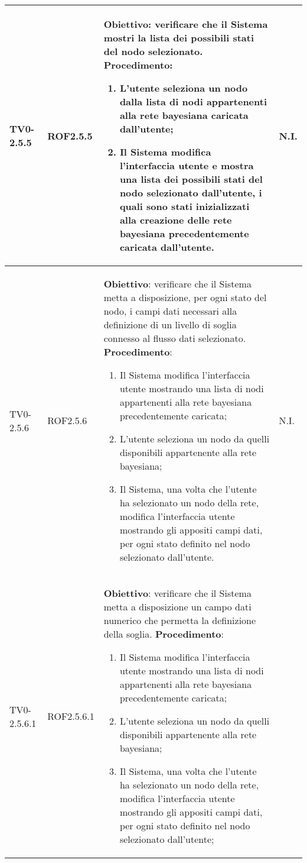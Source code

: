 \begin{longtable}{|C{.15\textwidth}|C{.13\textwidth}|m{.52\textwidth}|C{.08\textwidth}|}
\hline
TV0-2.5.5 & ROF2.5.5 &
	\textbf{Obiettivo}: verificare che il Sistema mostri la lista dei possibili stati del nodo selezionato. \newline
	\textbf{Procedimento}:
	\begin{enumerate}
		\item L'utente seleziona un nodo dalla lista di nodi appartenenti alla rete bayesiana caricata dall'utente;
		\item Il Sistema modifica l'interfaccia utente e mostra una lista dei possibili stati del nodo selezionato dall'utente, i quali sono stati inizializzati alla creazione delle rete bayesiana precedentemente caricata dall'utente.
	\end{enumerate}
	& N.I. \\
\hline
{} TV0-2.5.6 & ROF2.5.6 &
	\textbf{Obiettivo}: verificare che il Sistema metta a disposizione, per ogni stato del nodo, i campi dati necessari alla definizione di un livello di soglia connesso al flusso dati selezionato. \newline
	\textbf{Procedimento}:
	\begin{enumerate}
		\item Il Sistema modifica l'interfaccia utente mostrando una lista di nodi appartenenti alla rete bayesiana precedentemente caricata;
		\item L'utente seleziona un nodo da quelli disponibili appartenente alla rete bayesiana;
		\item Il Sistema, una volta che l'utente ha selezionato un nodo della rete, modifica l'interfaccia utente mostrando gli appositi campi dati, per ogni stato definito nel nodo selezionato dall'utente.
	\end{enumerate}
	& N.I. \\
\hline
TV0-2.5.6.1 & ROF2.5.6.1 &
	\textbf{Obiettivo}: verificare che il Sistema metta a disposizione un campo dati numerico che permetta la definizione della soglia. \newline
	\textbf{Procedimento}:
	\begin{enumerate}
		\item Il Sistema modifica l'interfaccia utente mostrando una lista di nodi appartenenti alla rete bayesiana precedentemente caricata;
		\item L'utente seleziona un nodo da quelli disponibili appartenente alla rete bayesiana;
		\item Il Sistema, una volta che l'utente ha selezionato un nodo della rete, modifica l'interfaccia utente mostrando gli appositi campi dati, per ogni stato definito nel nodo selezionato dall'utente;

\end{enumerate}
\end{longtable}
